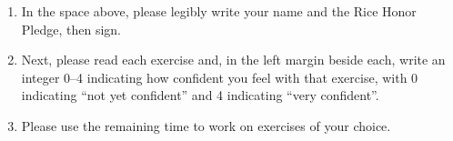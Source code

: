 \begin{enumerate}
\item In the space above, please legibly write your name and the Rice Honor Pledge, then sign.
\item Next, please read each exercise and, in the left margin beside each, write an integer 0--4 indicating how confident you feel with that exercise, with 0 indicating ``not yet confident'' and 4 indicating ``very confident''.
\item Please use the remaining time to work on exercises of your choice.
\end{enumerate}